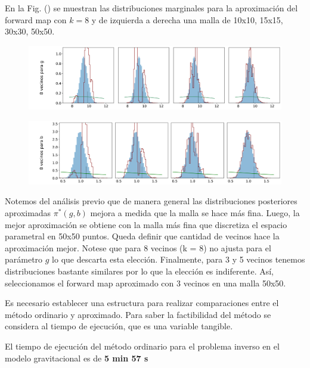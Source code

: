 En la Fig. () se muestran las distribuciones marginales para la aproximación del forward map con $k = 8$ y de izquierda a derecha una malla de 10x10, 15x15, 30x30, 50x50.

\begin{figure}[H] 
    \centering 
    \includegraphics[width = 16 cm ]{img/Exp_Central_gravedad_Sigma/Figuras/Generales/Convergencia_theta1_3_gravedad_sigma.png} 
\end{figure} 

\begin{figure}[H] 
    \centering 
    \includegraphics[width = 16 cm ]{img/Exp_Central_gravedad_Sigma/Figuras/Generales/Convergencia_theta2_3_gravedad_sigma.png} 
\end{figure} 

Notemos del análisis previo que de manera general las distribuciones posteriores aproximadas $\pi^{*}(g,b)$ mejora a medida que la malla se hace más fina. Luego, la mejor aproximación se obtiene con la malla más fina que discretiza el espacio parametral en 50x50 puntos. Queda definir que cantidad de vecinos hace la aproximación mejor. Notese que para 8 vecinos (k = 8) no ajusta para el parámetro $g$ lo que descarta esta elección. Finalmente, para 3 y 5 vecinos tenemos distribuciones bastante similares por lo que la elección es indiferente. Así, seleccionamos el forward map aproximado con 3 vecinos en una malla 50x50.

Es necesario establecer una estructura para realizar comparaciones entre el método ordinario y aproximado. Para saber la factibilidad del método se considera al tiempo de ejecución, que es una variable tangible. 

El tiempo de ejecución del método ordinario para el problema inverso en el modelo gravitacional es de \textbf{5 min 57 s}


